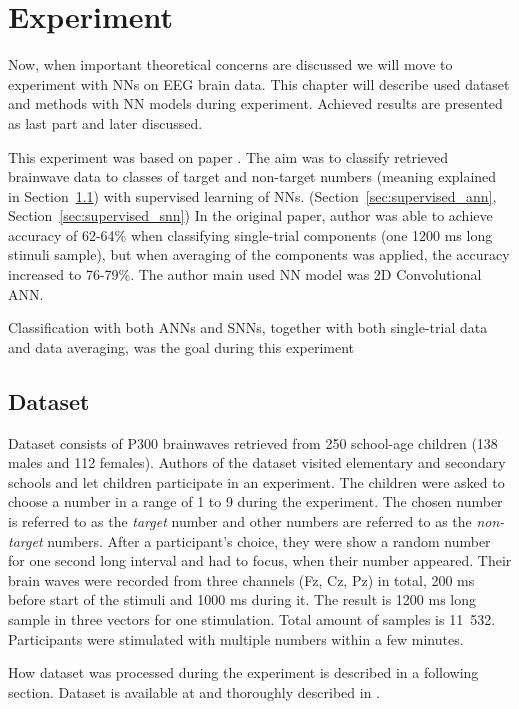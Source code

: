 \chapter{Experiment}%
\label{cha:experiment}

Now, when important theoretical concerns are discussed we will move to experiment with NNs on EEG brain data. This chapter will describe used dataset and methods with NN models during experiment. Achieved results are presented as last part and later discussed.

This experiment was based on paper \cite{varekap300}. The aim was to classify retrieved brainwave data to classes of target and non-target numbers (meaning explained in Section~\ref{sec:dataset}) with supervised learning of NNs. (Section~\ref{sec:supervised_ann}, Section~\ref{sec:supervised_snn}) In the original paper, author was able to achieve accuracy of 62-64\% when classifying single-trial components (one 1200 ms long stimuli sample), but when averaging of the components was applied, the accuracy increased to 76-79\%. The author main used NN model was 2D Convolutional ANN.

Classification with both ANNs and SNNs, together with both single-trial data and data averaging, was the goal during this experiment

%
%

\section{Dataset}%
\label{sec:dataset}

Dataset consists of P300 brainwaves retrieved from 250 school-age children (138 males and 112 females). Authors of the dataset visited elementary and secondary schools and let children participate in an experiment. The children were asked to choose a number in a range of 1 to 9 during the experiment. The chosen number is referred to as the \textit{target} number and other numbers are referred to as the \textit{non-target} numbers. After a participant's choice, they were show a random number for one second long interval and had to focus, when their number appeared. Their brain waves were recorded from three channels (Fz, Cz, Pz) in total, 200 ms before start of the stimuli and 1000 ms during it. The result is 1200 ms long sample in three vectors for one stimulation. Total amount of samples is 11~532. Participants were stimulated with multiple numbers within a few minutes.

How dataset was processed during the experiment is described in a following section. Dataset is available at \cite{dataset} and thoroughly described in \cite{dataset-article}.

